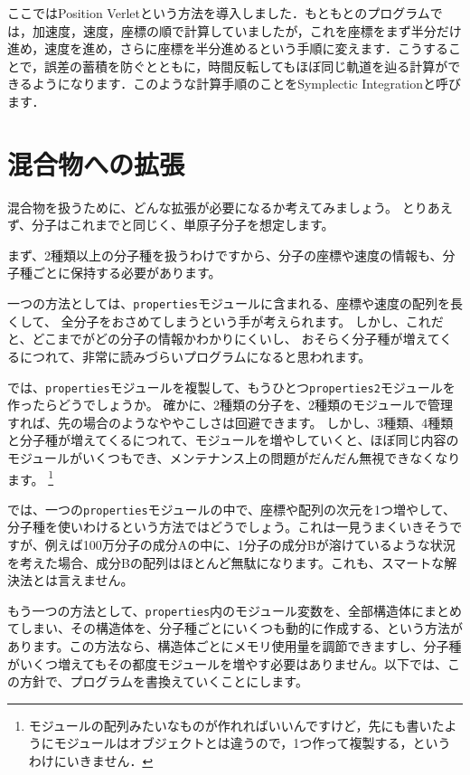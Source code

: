 \documentclass[a4,10pt]{article}
\begin{document}
ここではPosition Verletという方法を導入しました．もともとのプログラムでは，加速度，速度，座標の順で計算していましたが，これを座標をまず半分だけ進め，速度を進め，さらに座標を半分進めるという手順に変えます．こうすることで，誤差の蓄積を防ぐとともに，時間反転してもほぼ同じ軌道を辿る計算ができるようになります．このような計算手順のことをSymplectic Integrationと呼びます．


\section{混合物への拡張}

混合物を扱うために、どんな拡張が必要になるか考えてみましょう。
とりあえず、分子はこれまでと同じく、単原子分子を想定します。

まず、2種類以上の分子種を扱うわけですから、分子の座標や速度の情報も、分子種ごとに保持する必要があります。

一つの方法としては、{\tt properties}モジュールに含まれる、座標や速度の配列を長くして、
全分子をおさめてしまうという手が考えられます。
しかし、これだと、どこまでがどの分子の情報かわかりにくいし、
おそらく分子種が増えてくるにつれて、非常に読みづらいプログラムになると思われます。

では、{\tt properties}モジュールを複製して、もうひとつ{\tt properties2}モジュールを作ったらどうでしょうか。
確かに、2種類の分子を、2種類のモジュールで管理すれば、先の場合のようなややこしさは回避できます。
しかし、3種類、4種類と分子種が増えてくるにつれて、モジュールを増やしていくと、ほぼ同じ内容の
モジュールがいくつもでき、メンテナンス上の問題がだんだん無視できなくなります。
\footnote{モジュールの配列みたいなものが作れればいいんですけど，先にも書いたようにモジュールはオブジェクトとは違うので，1つ作って複製する，というわけにいきません．}

では、一つの{\tt properties}モジュールの中で、座標や配列の次元を1つ増やして、分子種を使いわけるという方法ではどうでしょう。これは一見うまくいきそうですが、例えば100万分子の成分Aの中に、1分子の成分Bが溶けているような状況を考えた場合、成分Bの配列はほとんど無駄になります。これも、スマートな解決法とは言えません。

もう一つの方法として、{\tt properties}内のモジュール変数を、全部構造体にまとめてしまい、その構造体を、分子種ごとにいくつも動的に作成する、という方法があります。この方法なら、構造体ごとにメモリ使用量を調節できますし、分子種がいくつ増えてもその都度モジュールを増やす必要はありません。以下では、この方針で、プログラムを書換えていくことにします。
\end{document}
